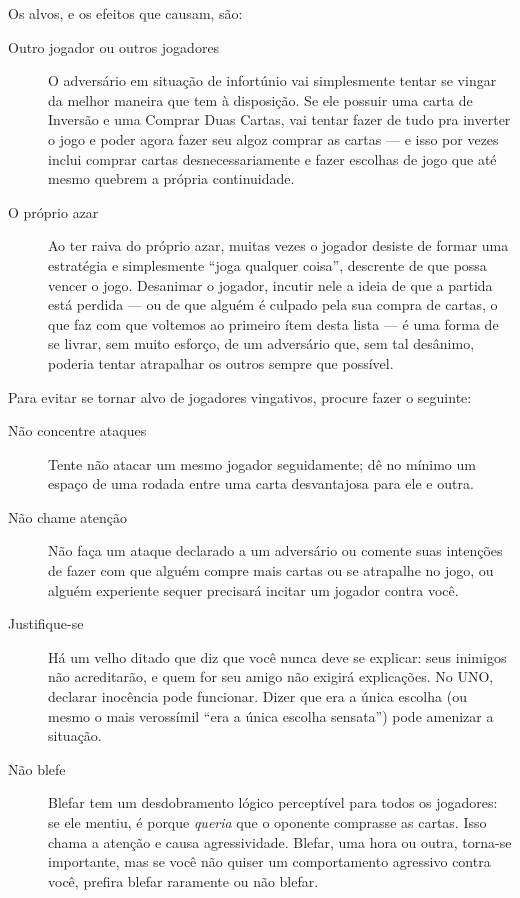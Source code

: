 Os alvos, e os efeitos que causam, são:

\begin{description}
\item[Outro jogador ou outros jogadores]{O adversário em situação de infortúnio vai simplesmente tentar se vingar da melhor maneira que tem à disposição. Se ele possuir uma carta de Inversão e uma Comprar Duas Cartas, vai tentar fazer de tudo pra inverter o jogo e poder agora fazer seu algoz comprar as cartas --- e isso por vezes inclui comprar cartas desnecessariamente e fazer escolhas de jogo que até mesmo quebrem a própria continuidade.}
\item[O próprio azar]{Ao ter raiva do próprio azar, muitas vezes o jogador desiste de formar uma estratégia e simplesmente ``joga qualquer coisa'', descrente de que possa vencer o jogo. Desanimar o jogador, incutir nele a ideia de que a partida está perdida --- ou de que alguém é culpado pela sua compra de cartas, o que faz com que voltemos ao primeiro ítem desta lista --- é uma forma de se livrar, sem muito esforço, de um adversário que, sem tal desânimo, poderia tentar atrapalhar os outros sempre que possível.}
\end{description}

Para evitar se tornar alvo de jogadores vingativos, procure fazer o seguinte:

\begin{description}
\item[Não concentre ataques]{Tente não atacar um mesmo jogador seguidamente; dê no mínimo um espaço de uma rodada entre uma carta desvantajosa para ele e outra.}
\item[Não chame atenção]{Não faça um ataque declarado a um adversário ou comente suas intenções de fazer com que alguém compre mais cartas ou se atrapalhe no jogo, ou alguém experiente sequer precisará incitar um jogador contra você.}
\item[Justifique-se]{Há um velho ditado que diz que você nunca deve se explicar: seus inimigos não acreditarão, e quem for seu amigo não exigirá explicações. No UNO, declarar inocência pode funcionar. Dizer que era a única escolha (ou mesmo o mais verossímil ``era a única escolha sensata'') pode amenizar a situação.}
\item[Não blefe]{Blefar tem um desdobramento lógico perceptível para todos os jogadores: se ele mentiu, é porque \textit{queria} que o oponente comprasse as cartas. Isso chama a atenção e causa agressividade. Blefar, uma hora ou outra, torna-se importante, mas se você não quiser um comportamento agressivo contra você, prefira blefar raramente ou não blefar.}
\end{description}

